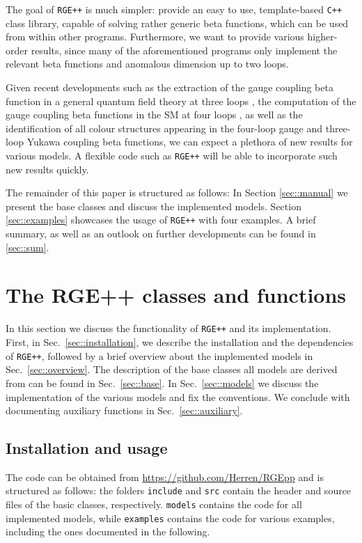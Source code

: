 \documentclass[11pt,a4paper]{article}
\begin{document}
The goal of \texttt{RGE++} is much simpler: provide an easy to use, template-based \texttt{C++} class library, capable of solving rather generic
beta functions, which can be used from within other programs. Furthermore, we want to provide various higher-order results, since many of
the aforementioned programs only implement the relevant beta functions and anomalous dimension up to two loops. 

Given recent developments
such as the extraction of the gauge coupling beta function in a general quantum field theory at three loops \cite{Poole:2019txl,Poole:2019kcm}, the computation
of the gauge coupling beta functions in the SM at four loops \cite{Davies:2019onf}, as well as the identification of all colour structures appearing in the four-loop
gauge and three-loop Yukawa coupling beta functions, we can expect a plethora of new results for various models. A flexible code such as \texttt{RGE++}
will be able to incorporate such new results quickly.

The remainder of this paper is structured as follows: In Section \ref{sec::manual} we present the base classes and discuss the implemented models.
Section \ref{sec::examples} showcases the usage of \texttt{RGE++} with four examples.
A brief summary, as well as an outlook on further developments can be found in \ref{sec::sum}.


\section{\label{sec::manual}The RGE++ classes and functions}
In this section we discuss the functionality of \texttt{RGE++} and its implementation. First, in Sec.~\ref{sec::installation}, we describe the installation and the dependencies of \texttt{RGE++},
followed by a brief overview about the implemented models in Sec.~\ref{sec::overview}.
The description of the base classes all models are derived from can be found in Sec.~\ref{sec::base}. In Sec.~\ref{sec::models} we discuss the implementation of the various models
and fix the conventions. We conclude with documenting auxiliary functions in Sec.~\ref{sec::auxiliary}.

\subsection{\label{sec::installation}Installation and usage}
The code can be obtained from \url{https://github.com/Herren/RGEpp} and is structured as follows: the folders \texttt{include} and \texttt{src} contain the header and source files of the basic classes, respectively.
\texttt{models} contains the code for all implemented models, while \texttt{examples} contains the code for various examples, including the ones documented in the following.
\end{document}
